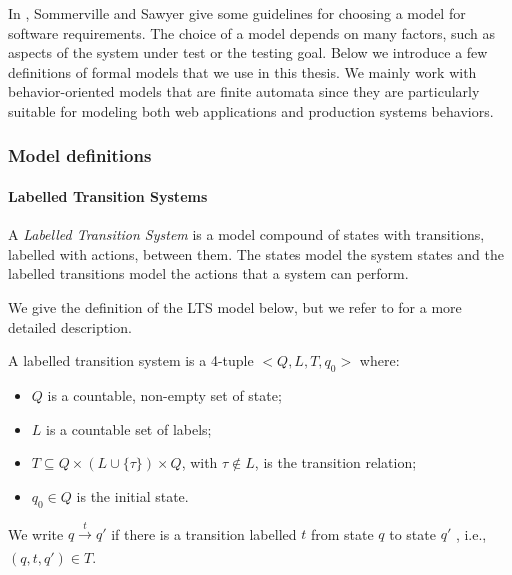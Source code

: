 In \cite{Sommerville:1997:REG:549198}, Sommerville and Sawyer
give some guidelines for choosing a model for software
requirements. The choice of a model depends on many factors, such
as aspects of the system under test or the testing goal.  Below
we introduce a few definitions of formal models that we use in
this thesis. We mainly work with behavior-oriented models that
are finite automata since they are particularly suitable for
modeling both web applications and production systems behaviors.

\subsubsection{Model definitions}

\paragraph{Labelled Transition Systems}
\label{sec:definitions:lts}

A \textit{Labelled Transition System} is a model compound of
states with transitions, labelled with actions, between them.
The states model the system states and the labelled transitions
model the actions that a system can perform.

We give the definition of the LTS model below, but we refer to
\cite{ltsTretmans} for a more detailed description.

\begin{definition}
    A labelled transition system is a 4-tuple $<Q,L,T,q_0>$ where:

    \begin{itemize}
    \item $Q$ is a countable, non-empty set of state;

    \item $L$ is a countable set of labels;

    \item $T \subseteq Q \times (L \cup \{\tau\}) \times Q$, with
    $\tau \not\in L$, is the transition relation;

    \item $q_0 \in Q$ is the initial state.

    \end{itemize}

    We write $q \xrightarrow[]{t} q'$ if there is a transition
    labelled $t$ from state $q$ to state $q'$ , i.e., $(q, t, q')
    \in T$.

	\label{def:lts}
\end{definition}


